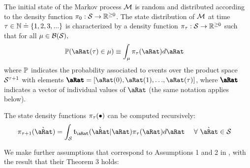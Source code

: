 \documentclass[../BufferStockTheory.tex]{subfiles}\usepackage{ApndxSteadyState}
\begin{document}
  The initial state of the Markov process $\Mrkv$ is random  and distributed according to the density function $\pDens_{0} : \DistSetSprtFull \rightarrow \reals^{\geq 0}$.  The state distribution of $\Mrkv$ at time $\tAbs \in \Nteger \doteq  \{1,2,3,...\}$ is characterized by a density function $\pDens_{\tAbs} : \mathcal{\DistSetSprtFull} \rightarrow \reals^{\geq 0}$ such that for all $\SetSub \in \Borel({\DistSetSprtFull}),$
  \begin{align}
    \Pmeas(\point(\tAbs) \in \SetSub) & \equiv \int_{\SetSub} \pDens_{\tAbs}(\point)d\point
  \end{align}
  where $\Pmeas$ indicates the probability associated to events over the product space $\DistSetSprtFull^{\tAbs+1}$ with elements $\vctr{\point}=[\point(0),\point(1),{\dots},\point(\tAbs)]$, where $\vctr{\point}$ indicates a vector of individual values of $\point$ (the same notation applies below).

  The state density functions $\pDens_{\tAbs}(\bullet)$ can be computed recursively:
  \begin{align}
    \pDens_{\tAbs+1}(\Nxt{\point}) &= \int_{\DistSetSprtFull} \trns_{\point}(\Nxt{\point}|\point)\pDens_{\tAbs}(\point)d\point ~~~~ \forall~\Nxt{\point} \in \DistSetSprtFull \label{eq:stateDensity}
  \end{align}

  We make further assumptions that correspond to Assumptions 1 and 2 in \cite{saDiscretize}, with the result that their Theorem 3 holds:
  \begin{comment} %
  \textbf{Assumption \ref{assn:Bounded}} For given sets $\TrnsSetSprtTrnc \subset \DistSetSprtFull^{2}$ and $\DistSetSprtTrnc_{0} \subset \DistSetSprtFull$, there exist positive constants $\epsilon$ and $\epsilon_{0}$, such that $\trns_{\point}(\Nxt{\point}|\point) $ and $\pDens_{0}(\point)$ satisfy the following conditions:

  \begin{align}
    \trns_{\point}(\Nxt{\point}|\point) \leq \epsilon ~~~~\forall(\point,\Nxt{\point})~\in~\DistSetSprtFull \backslash \TrnsSetSprtTrnc, \text{~and~} \pDens_{0}(\point) \leq \epsilon_{0}
  \end{align}

  \textbf{Assumption \ref{assn:Lipschitz}} see \cite{eaDiscretize} Assumption 2.
\end{comment}
\end{document}
